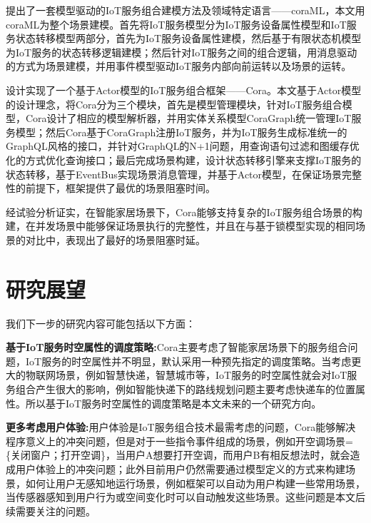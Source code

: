 \documentclass[winfonts,master,twoside]{njuthesis}
\begin{document}
提出了一套模型驱动的IoT服务组合建模方法及领域特定语言——coraML，本文用coraML为整个场景建模。首先将IoT服务模型分为IoT服务设备属性模型和IoT服务状态转移模型两部分，首先为IoT服务设备属性建模，然后基于有限状态机模型为IoT服务的状态转移逻辑建模；然后针对IoT服务之间的组合逻辑，用消息驱动的方式为场景建模，并用事件模型驱动IoT服务内部向前运转以及场景的运转。

设计实现了一个基于Actor模型的IoT服务组合框架——Cora。本文基于Actor模型的设计理念，将Cora分为三个模块，首先是模型管理模块，针对IoT服务组合模型，Cora设计了相应的模型解析器，并用实体关系模型CoraGraph统一管理IoT服务模型；然后Cora基于CoraGraph注册IoT服务，并为IoT服务生成标准统一的GraphQL风格的接口，并针对GraphQL的N+1问题，用查询语句过滤和图缓存优化的方式优化查询接口；最后完成场景构建，设计状态转移引擎来支撑IoT服务的状态转移，基于EventBus实现场景消息管理，并基于Actor模型，在保证场景完整性的前提下，框架提供了最优的场景阻塞时间。

经试验分析证实，在智能家居场景下，Cora能够支持复杂的IoT服务组合场景的构建，在并发场景中能够保证场景执行的完整性，并且在与基于锁模型实现的相同场景的对比中，表现出了最好的场景阻塞时延。
\section{研究展望}
我们下一步的研究内容可能包括以下方面：

\textbf{基于IoT服务时空属性的调度策略:}Cora主要考虑了智能家居场景下的服务组合问题，IoT服务的时空属性并不明显，默认采用一种预先指定的调度策略。当考虑更大的物联网场景，例如智慧快递，智慧城市等，IoT服务的时空属性就会对IoT服务组合产生很大的影响，例如智能快递下的路线规划问题主要考虑快递车的位置属性。所以基于IoT服务时空属性的调度策略是本文未来的一个研究方向。

\textbf{更多考虑用户体验:}用户体验是IoT服务组合技术最需考虑的问题，Cora能够解决程序意义上的冲突问题，但是对于一些指令事件组成的场景，例如开空调场景=\{关闭窗户；打开空调\}，当用户A想要打开空调，而用户B有相反想法时，就会造成用户体验上的冲突问题；此外目前用户仍然需要通过模型定义的方式来构建场景，如何让用户无感知地运行场景，例如框架可以自动为用户构建一些常用场景，当传感器感知到用户行为或空间变化时可以自动触发这些场景。这些问题是本文后续需要关注的问题。



\end{document}
